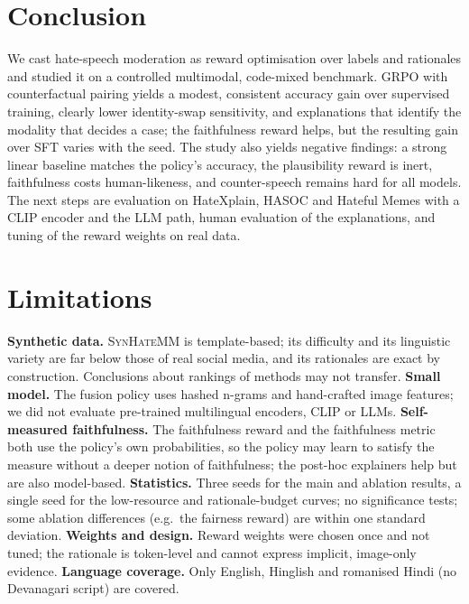\documentclass[11pt]{article}
\begin{document}
\section{Conclusion}
We cast hate-speech moderation as reward optimisation over labels and rationales and studied it on a controlled multimodal, code-mixed benchmark. GRPO with counterfactual pairing yields a modest, consistent accuracy gain over
supervised training, clearly lower identity-swap sensitivity, and explanations that identify the modality that decides a case; the faithfulness reward helps, but the resulting gain over SFT varies with the seed. The study also yields negative findings:
a strong linear baseline matches the policy's accuracy, the plausibility reward is inert, faithfulness costs human-likeness, and counter-speech remains hard for all models. The next steps are
evaluation on HateXplain, HASOC and Hateful Memes with a CLIP encoder and the LLM path, human evaluation of the explanations, and tuning of the reward weights on real data.

\section*{Limitations}
\textbf{Synthetic data.} \textsc{SynHateMM} is template-based; its difficulty and its linguistic variety are far below those of real social media, and its rationales are exact by construction.
Conclusions about rankings of methods may not transfer. \textbf{Small model.} The fusion policy uses hashed n-grams and hand-crafted image features; we did not evaluate pre-trained multilingual encoders, CLIP or LLMs. \textbf{Self-measured faithfulness.}
The faithfulness reward and the faithfulness metric both use the policy's own probabilities, so the policy may learn to satisfy the measure without a deeper notion of faithfulness; the post-hoc explainers help but are also model-based.
\textbf{Statistics.} Three seeds for the main and ablation results, a single seed for the low-resource and rationale-budget curves; no significance tests; some ablation differences (e.g.\ the fairness reward) are within one standard deviation.
\textbf{Weights and design.} Reward weights were chosen once and not tuned; the rationale is token-level and cannot express implicit, image-only evidence. \textbf{Language coverage.} Only English, Hinglish and romanised Hindi (no Devanagari script) are covered.
\end{document}
